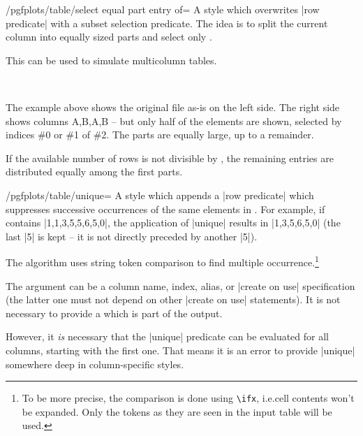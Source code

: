 \begin{stylekey}{/pgfplots/table/select equal part entry of=}
    A style which overwrites |row predicate| with a subset selection predicate.
    The idea is to split the current column into  equally
    sized parts and select only .

    This can be used to simulate multicolumn tables.
\begin{codeexample}[pre={\begin{lateximage}},post={\end{lateximage}}]

%
~
\end{codeexample}
    The example above shows the original file as-is on the left side. The right
    side shows columns A,B,A,B -- but only half of the elements are shown,
    selected by indices \#0 or \#1 of \#2. The parts are equally large, up to a
    remainder.

    If the available number of rows is not divisible by , the
    remaining entries are distributed equally among the first parts.
\end{stylekey}

\begin{stylekey}{/pgfplots/table/unique=}
    A style which appends a |row predicate| which suppresses successive
    occurrences of the same elements in . For example, if
     contains |1,1,3,5,5,6,5,0|, the application of |unique|
    results in |1,3,5,6,5,0| (the last |5| is kept -- it is not directly
    preceded by another |5|).

    The algorithm uses string token comparison to find multiple
    occurrence.\footnote{To be more precise, the comparison is done using
    \texttt{\textbackslash ifx}, i.e.\@ cell contents won't be expanded. Only
    the tokens as they are seen in the input table will be used.}

    The argument  can be a column name, index, alias, or
    |create on use| specification (the latter one must not depend on other
    |create on use| statements). It is not necessary to provide a  which is part of the output.

    However, it \emph{is} necessary that the |unique| predicate can be
    evaluated for all columns, starting with the first one. That means it is an
    error to provide |unique| somewhere deep in column-specific styles.
\end{stylekey}


